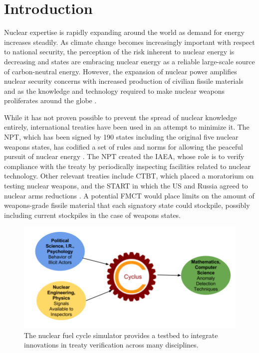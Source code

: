 \section{Introduction}
\label{s_motive}


Nuclear expertise is rapidly expanding around the world as demand for energy increases steadily\cite{mooney_why_2014}.  As climate change becomes increasingly important with respect to national security, the perception of the risk inherent to nuclear energy is decreasing and states are embracing nuclear energy as a reliable large-scale source of carbon-neutral energy.  However, the expansion of nuclear power amplifies nuclear security concerns with increased production of civilian fissile materials and as the knowledge and technology required to make nuclear weapons proliferates around the globe \cite{feiveson_unmaking_2014}.  

While it has not proven possible to prevent the spread of nuclear knowledge entirely, international treaties have been used in an attempt to minimize it.  The \gls{NPT}, which has been signed by 190 states including the original five nuclear weapons states, has codified a set of rules and norms for allowing the peaceful pursuit of nuclear energy \cite{_treaty_????}.  The \gls{NPT} created the \gls{IAEA}, whose role is to verify compliance with the treaty by periodically inspecting facilities related to nuclear technology.  Other relevant treaties include \gls{CTBT}, which placed a moratorium on testing nuclear weapons, and the \gls{START} in which the \gls{US} and Russia agreed to nuclear arms reductions \cite{_treaty:_????, department_of_State_new_2010}.  A potential \gls{FMCT} would place limits on the amount of weapons-grade fissile material that each signatory state could stockpile, possibly including current stockpiles in the case of weapons states.

\begin{figure}%
\begin{center}
\includegraphics[natwidth=162bp,natheight=227bp, scale=0.45]{./figs/cyclus_interdiscipline.png}
\end{center}
\caption{The \Cyclus nuclear fuel cycle simulator provides a testbed to integrate innovations in treaty verification across many disciplines.}
\label{fig:cyclus_diagram}
\end{figure}

